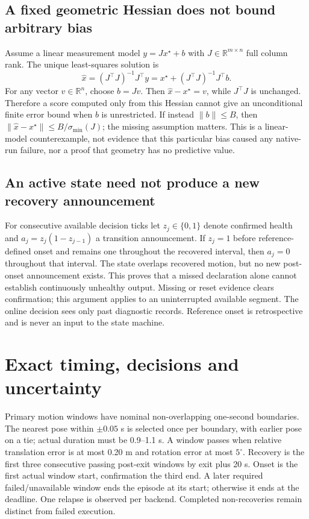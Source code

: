 \documentclass[conference,onecolumn]{IEEEtran}
\begin{document}
\subsection{A fixed geometric Hessian does not bound arbitrary bias}
Assume a linear measurement model $y=Jx^\star+b$ with $J\in\mathbb R^{m\times n}$
full column rank. The unique least-squares solution is
\begin{equation}
\widehat{x}=(J^\top J)^{-1}J^\top y
=x^\star+(J^\top J)^{-1}J^\top b.
\end{equation}
For any vector $v\in\mathbb R^n$, choose $b=Jv$. Then
$\widehat{x}-x^\star=v$, while $J^\top J$ is unchanged. Therefore a score
computed only from this Hessian cannot give an unconditional finite error bound
when $b$ is unrestricted. If instead $\lVert b\rVert\leq B$, then
$\lVert\widehat{x}-x^\star\rVert\leq B/\sigma_{\min}(J)$; the missing
assumption matters. This is a linear-model counterexample, not evidence that
this particular bias caused any native-run failure, nor a proof that geometry
has no predictive value.

\subsection{An active state need not produce a new recovery announcement}
For consecutive available decision ticks let $z_j\in\{0,1\}$ denote confirmed
health and $a_j=z_j(1-z_{j-1})$ a transition announcement. If $z_j=1$ before
reference-defined onset and remains one throughout the recovered interval,
then $a_j=0$ throughout that interval. The state overlaps recovered motion,
but no new post-onset announcement exists. This proves that a missed declaration
alone cannot establish continuously unhealthy output. Missing or reset evidence
clears confirmation; this argument applies to an uninterrupted available segment.
The online decision sees only past diagnostic records. Reference onset is
retrospective and is never an input to the state machine.

\section{Exact timing, decisions and uncertainty}
Primary motion windows have nominal non-overlapping one-second boundaries.
The nearest pose within $\pm0.05$ s is selected once per boundary, with earlier
pose on a tie; actual duration must be 0.9--1.1 s. A window passes when relative
translation error is at most 0.20 m and rotation error at most $5^\circ$.
Recovery is the first three consecutive passing post-exit windows by exit plus
20 s. Onset is the first actual window start, confirmation the third end.
A later required failed/unavailable window ends the episode at its start;
otherwise it ends at the deadline. One relapse is observed per backend.
Completed non-recoveries remain distinct from failed execution.
\end{document}

